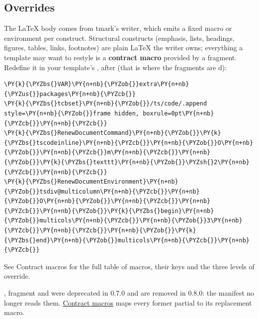\documentclass[a4paper,twoside]{article}
\begin{document}
\subsection{Overrides}
The \LaTeX{} body comes from tmark's writer, which emits a fixed macro or
environment per construct. Structural constructs (emphasis, lists, headings,
figures, tables, links, footnotes) are plain \LaTeX{} the writer owns; everything a
template may want to restyle is a \textbf{contract macro} provided by a 
fragment. Redefine it in your template's , after 
(that is where the fragments are d):
\begin{tscode}[lang=latex, engine=pygments]
\begin{Verbatim}[commandchars=\\\{\},breaklines, breakanywhere, commandchars=\\\{\}]
\PY{k}{\PYZbs{}VAR}\PY{n+nb}{\PYZob{}}extra\PY{n+nb}{\PYZus{}}packages\PY{n+nb}{\PYZcb{}}
\PY{k}{\PYZbs{}tcbset}\PY{n+nb}{\PYZob{}}/ts/code/.append style=\PY{n+nb}{\PYZob{}}frame hidden, boxrule=0pt\PY{n+nb}{\PYZcb{}}\PY{n+nb}{\PYZcb{}}
\PY{k}{\PYZbs{}RenewDocumentCommand}\PY{n+nb}{\PYZob{}}\PY{k}{\PYZbs{}tscodeinline}\PY{n+nb}{\PYZcb{}}\PY{n+nb}{\PYZob{}}O\PY{n+nb}{\PYZob{}}\PY{n+nb}{\PYZcb{}}m\PY{n+nb}{\PYZcb{}}\PY{n+nb}{\PYZob{}}\PY{k}{\PYZbs{}texttt}\PY{n+nb}{\PYZob{}}\PYZsh{}2\PY{n+nb}{\PYZcb{}}\PY{n+nb}{\PYZcb{}}
\PY{k}{\PYZbs{}RenewDocumentEnvironment}\PY{n+nb}{\PYZob{}}tsdiv@multicolumn\PY{n+nb}{\PYZcb{}}\PY{n+nb}{\PYZob{}}O\PY{n+nb}{\PYZob{}}\PY{n+nb}{\PYZcb{}}\PY{n+nb}{\PYZcb{}}\PY{n+nb}{\PYZob{}}\PY{k}{\PYZbs{}begin}\PY{n+nb}{\PYZob{}}multicols\PY{n+nb}{\PYZcb{}}\PY{n+nb}{\PYZob{}}3\PY{n+nb}{\PYZcb{}}\PY{n+nb}{\PYZcb{}}\PY{n+nb}{\PYZob{}}\PY{k}{\PYZbs{}end}\PY{n+nb}{\PYZob{}}multicols\PY{n+nb}{\PYZcb{}}\PY{n+nb}{\PYZcb{}}
\end{Verbatim}
\end{tscode}
See Contract macros for the full table of macros, their keys and
the three levels of override.
\begin{tscallout}[kind=warning, title={Jinja partials are no longer the rendering layer}]
, fragment  and  were
deprecated in 0.7.0 and are removed in 0.8.0: the manifest no longer reads
them. \href{partials.md\#former-partials}{Contract macros} maps every former
partial to its replacement macro.
\end{tscallout}
\end{document}
